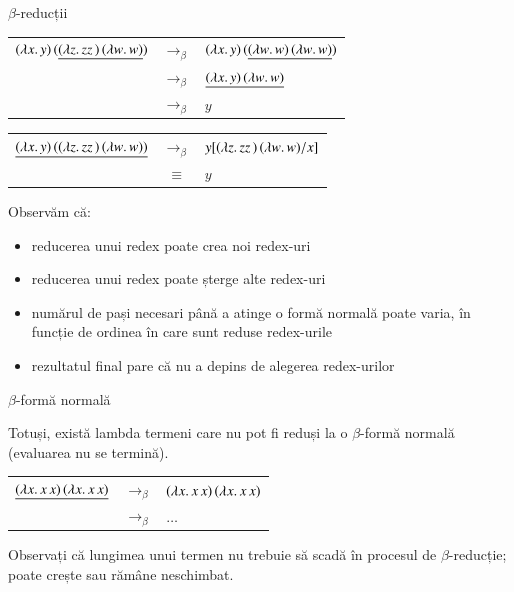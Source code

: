 \documentclass[xcolor=pdftex,romanian,colorlinks]{beamer}
\begin{document}
\begin{frame}[fragile]{$\beta$-reducții}

\begin{center}
\begin{tabular}{rcl}
$(\lambda x.\,y)\, (\underline{(\lambda z.\,zz\, )\, (\lambda w.\,w)})$ & $\rightarrow_\beta$ &  $(\lambda x.\,y)\, (\underline{(\lambda w.\,w)\, (\lambda w.\,w)})$ \\
& $\rightarrow_\beta$ & $\underline{(\lambda x.\,y)\, (\lambda w.\,w)}$ \\
& $\rightarrow_\beta$ & $y$ \\
\end{tabular}
\end{center}

\begin{center}
\begin{tabular}{rcl}
$\underline{(\lambda x.\,y)\, ((\lambda z.\,zz\, )\, (\lambda w.\,w))}$ & $\rightarrow_\beta$ & $y[(\lambda z.\,zz\, )\, (\lambda w.\,w)/x]$ \\ 
& $\equiv$ & $y$ \\
\end{tabular}
\end{center}

Observăm că:
\begin{itemize}
	\item reducerea unui redex poate crea noi redex-uri
	\item reducerea unui redex poate șterge alte redex-uri
	\item numărul de pași necesari până a atinge o formă normală poate varia, în funcție de ordinea în care sunt reduse redex-urile
	\item rezultatul final pare că nu a depins de alegerea redex-urilor 
\end{itemize}

\end{frame}


\begin{frame}[fragile]{$\beta$-formă normală}

Totuși, există lambda termeni care nu pot fi reduși la o $\beta$-formă normală (evaluarea nu se termină).

\begin{center}
\begin{tabular}{rcl}
$\underline{(\lambda x.\,x\, x)\, (\lambda x.\,x\, x)}$ & $\rightarrow_\beta$ & $(\lambda x.\,x\, x)\, (\lambda x.\,x\, x)$ \\
& $\rightarrow_\beta$ & $\ldots$ \\
\end{tabular}
\end{center}

Observați că lungimea unui termen nu trebuie să scadă în procesul de $\beta$-reducție; poate crește sau rămâne neschimbat.
\end{frame}
\end{document}
